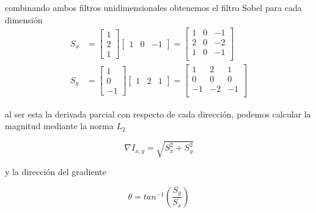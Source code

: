         \noindent combinando ambos filtros unidimensionales obtenemos el filtro Sobel para cada dimensión
        \begin{equation}
        \begin{aligned}
        S_x &=  \begin{bmatrix}
                 1\\
                 2\\
                 1
                 \end{bmatrix}
                 \begin{bmatrix}
                 1 & 0 & -1
                 \end{bmatrix}=
                 \begin{bmatrix}
                 1 &  0 &  -1\\
                 2 &  0 &  -2\\
                 1 &  0 &  -1\\
                 \end{bmatrix}\\
        S_y &=  \begin{bmatrix}
                 1\\
                 0\\
                 -1
                 \end{bmatrix}
                 \begin{bmatrix}
                 1 & 2 & 1
                 \end{bmatrix}=
                 \begin{bmatrix}
                 1 &  2 &  1\\
                 0 &  0 &  0\\
                 -1 &  -2 &  -1\\
                 \end{bmatrix}
        \end{aligned}
        \end{equation}
        
        \noindent al ser esta la derivada parcial con respecto de cada dirección, podemos calcular la magnitud mediante la norma $L_2$
        
        \begin{equation}
            \nabla I_{x, y} = \sqrt{S_x^2 + S_y^2}
        \end{equation}
        
        \noindent y la dirección del gradiente
        
        \begin{equation}
            \theta = tan^{-1}\left(\frac{S_y}{S_x}\right)
        \end{equation}
        
